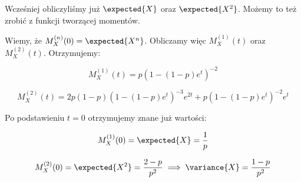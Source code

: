 \begin{corollary}
	\label{variance-of-geometric-by-mgf}
	Wcześniej obliczyliśmy już \( \expected{X} \) oraz \( \expected{X^2} \). Możemy to też zrobić z funkcji tworzącej momentów.

	Wiemy, że \( M_X^{(n)}(0) = \expected{X^n} \). Obliczamy więc \( M_X^{(1)}(t) \) oraz \( M_X^{(2)}(t) \). Otrzymujemy:

	\[
		M_X^{(1)}(t) = p(1-(1-p)e^t)^{-2}
	\]

	\[
		M_X^{(2)}(t) = 2p(1-p)(1-(1-p)e^t)^{-3}e^{2t} + p(1-(1-p)e^t)^{-2}e^t
	\]

	Po podstawieniu \( t = 0 \) otrzymujemy znane już wartości:

	\[
		M_X^{(1)}(0) = \expected{X} = \frac{1}{p}
	\]

	\[
		M_X^{(2)}(0) = \expected{X^2} = \frac{2-p}{p^2} \implies \variance{X} = \frac{1-p}{p^2}
	\]
\end{corollary}
